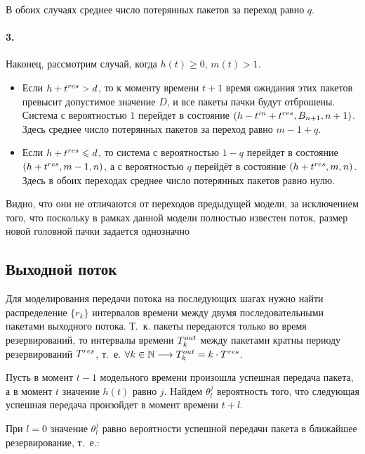 В обоих случаях среднее число потерянных пакетов за переход равно $q$.

\paragraph{3.} Наконец, рассмотрим случай, когда $h(t) \geqslant 0$, $m(t) > 1$. 

\begin{itemize}
\item Если $h + t^{res} > d$, то к моменту времени $t + 1$ время ожидания этих пакетов превысит допустимое значение $D$, и все пакеты пачки будут отброшены. Система с вероятностью $1$ перейдет в состояние $(h - t^{in} + t^{res}, B_{n+1}, n+1)$. Здесь среднее число потерянных пакетов за переход равно $m - 1 + q$.
\item Если $h + t^{res} \leqslant d$, то система с вероятностью $1 - q$ перейдет в состояние $(h + t^{res}, m - 1, n)$, а с вероятностью $q$ перейдёт в состояние $(h + t^{res}, m, n)$. Здесь в обоих переходах среднее число потерянных пакетов равно нулю.
\end{itemize} 





Видно, что они не отличаются от переходов предыдущей модели, за исключением того, что поскольку в рамках данной модели полностью известен поток, размер новой головной пачки задается однозначно







\subsection{Выходной поток}
\label{outputStream1}
Для моделирования передачи потока на последующих шагах нужно найти распределение $\{r_k\}$ интервалов времени между двумя последовательными пакетами выходного потока.
Т.~к. пакеты передаются только во время резервирований, то интервалы времени $T^{out}_k$ между пакетами кратны периоду резервирований $T^{res}$, т.~е. $\forall k \in \mathbb{N} \longrightarrow T^{out}_k = k \cdot T^{res}$.

Пусть в момент $t-1$ модельного времени произошла успешная передача пакета, а в момент $t$ значение $h(t)$ равно $j$. Найдем $\theta_l^j$ вероятность того, что следующая успешная передача произойдет в момент времени $t + l$. 

При $l = 0$ значение $\theta_l^j$ равно вероятности успешной передачи пакета в ближайшее резервирование, т.~е.:

